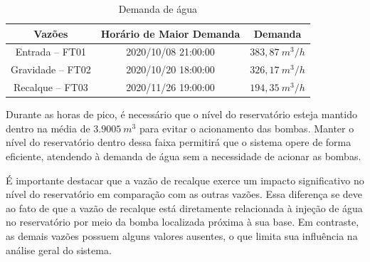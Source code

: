 \begin{table}[!htb]
	\centering
	\caption{Demanda de água}\label{tb:dem}
	\begin{tabular}{@{}ccc@{}}
		\toprule
		\textbf{Vazões}         & \textbf{Horário de Maior Demanda} & \textbf{Demanda} \\ \midrule
		Entrada -- FT01   & 2020/10/08 21:00:00               & $383,87 \ m^3/h$                   \\
		Gravidade -- FT02 & 2020/10/20 18:00:00               & $326,17 \ m^3/h$                    \\
		Recalque -- FT03  & 2020/11/26 19:00:00               & $194,35 \ m^3/h$                    \\ \bottomrule
	\end{tabular}
	
	
\end{table}

Durante as horas de pico, é necessário que o nível do reservatório esteja mantido dentro na média de $3.9005 \ m^3$ para evitar o acionamento das bombas. Manter o nível do reservatório dentro dessa faixa permitirá que o sistema opere de forma eficiente, atendendo à demanda de água sem a necessidade de acionar as bombas.

É importante destacar que a vazão de recalque exerce um impacto significativo no nível do reservatório em comparação com as outras vazões. Essa diferença se deve ao fato de que a vazão de recalque está diretamente relacionada à injeção de água no reservatório por meio da bomba localizada próxima à sua base. Em contraste, as demais vazões possuem alguns valores ausentes, o que limita sua influência na análise geral do sistema.







